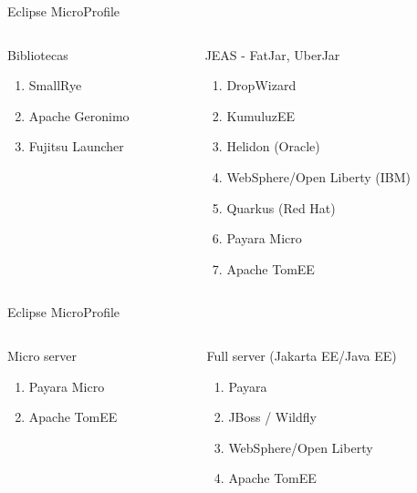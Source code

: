 \documentclass[aspectratio=169]{beamer}
\begin{document}
\begin{frame}{Eclipse MicroProfile}
\small
    \begin{columns}
        \begin{column}{0.5\textwidth}
    	  Bibliotecas
          \begin{enumerate}
              \item SmallRye
              \item Apache Geronimo
              \item Fujitsu Launcher
          \end{enumerate}
    	\end{column}
    	\begin{column}{0.5\textwidth}  %
        JEAS - FatJar, UberJar
    		\begin{enumerate}
                \item DropWizard
                \item KumuluzEE
                \item Helidon (Oracle)
                \item WebSphere/Open Liberty (IBM)
                \item Quarkus (Red Hat)
                \item Payara Micro
                \item Apache TomEE
            \end{enumerate}

    	\end{column}
    \end{columns}
\end{frame}

\begin{frame}{Eclipse MicroProfile}
\small
    \begin{columns}
        \begin{column}{0.5\textwidth}
    	  Micro server
          \begin{enumerate}
              \item Payara Micro
              \item Apache TomEE
          \end{enumerate}
    	\end{column}
    	\begin{column}{0.5\textwidth}  %
        Full server (Jakarta EE/Java EE)
    		\begin{enumerate}
                \item Payara
                \item JBoss / Wildfly
                \item WebSphere/Open Liberty
                \item Apache TomEE
            \end{enumerate}

    	\end{column}
    \end{columns}
\end{frame}
\end{document}
